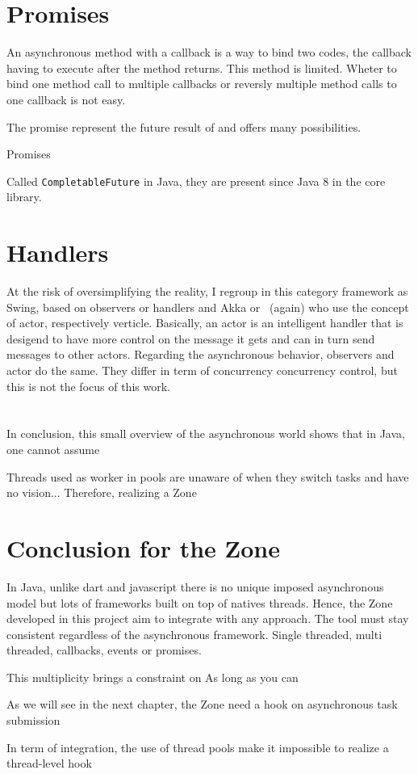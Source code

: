 \section{Promises}

An asynchronous method with a callback is a way to bind two codes, the callback having to execute after the method returns. This method is limited. Wheter to bind one method call to multiple callbacks or reversly multiple method calls to one callback is not easy. 

The promise represent the future result of 
and offers many possibilities. 

Promises


Called \lstinline{CompletableFuture} in Java, they are present since Java 8 in the core library.


\section{Handlers}
At the risk of oversimplifying the reality, I regroup in this category framework as Swing, based on observers or handlers
and Akka or \vertx\ (again) who use the concept of actor, respectively verticle. Basically, an actor is an intelligent handler that is desigend to have more control on the message it gets and can in turn send messages to other actors. Regarding the asynchronous behavior, observers and actor do the same. They differ in term of concurrency concurrency control, but this is not the focus of this work.


\section*{}
In conclusion, this small overview of the asynchronous world shows that in Java, one cannot assume

Threads used as worker in pools are unaware of when they switch tasks and have no vision...
Therefore, realizing a Zone 


\section*{Conclusion for the Zone} %
In Java, unlike dart and javascript there is no unique imposed asynchronous model but lots of frameworks built on top of natives threads.
Hence, the Zone developed in this project aim to integrate with any approach. The tool must stay consistent regardless of the asynchronous framework. Single threaded, multi threaded, callbacks, events or promises.

This multiplicity brings a constraint on
As long as you can 

As we will see in the next chapter, the Zone need a hook on asynchronous task submission

In term of integration, the use of thread pools make it impossible to realize a thread-level hook